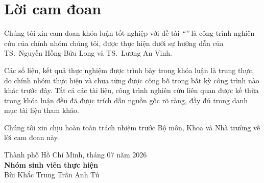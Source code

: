 \chapter*{Lời cam đoan}
\label{commitment}

Chúng tôi xin cam đoan khóa luận tốt nghiệp với đề tài \textit{``\tenKL''} là công
trình nghiên cứu của chính nhóm chúng tôi, được thực hiện dưới sự hướng dẫn của
TS.~Nguyễn Hồng Bửu Long và TS.~Lương An Vinh.

Các số liệu, kết quả thực nghiệm được trình bày trong khóa luận là trung thực, do
chính nhóm thực hiện và chưa từng được công bố trong bất kỳ công trình nào khác
trước đây. Tất cả các tài liệu, công trình nghiên cứu liên quan được kế thừa trong
khóa luận đều đã được trích dẫn nguồn gốc rõ ràng, đầy đủ trong danh mục tài liệu
tham khảo.

Chúng tôi xin chịu hoàn toàn trách nhiệm trước Bộ môn, Khoa và Nhà trường về lời
cam đoan này.

\begin{flushright}
\begin{minipage}{0.62\textwidth}
\centering
Thành phố Hồ Chí Minh, tháng 07 năm 2026\\[2mm]
\textbf{Nhóm sinh viên thực hiện}\\[18mm]
Bùi Khắc Trung \hspace{10mm} Trần Anh Tú
\end{minipage}
\end{flushright}

